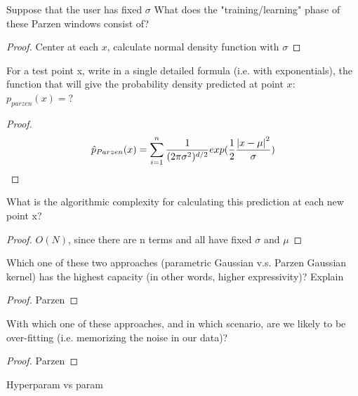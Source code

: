 \documentclass[12pt]{article}
\newenvironment{problem}[2][Problem]{\begin{trivlist}
\item[\hskip \labelsep {\bfseries #1}\hskip \labelsep {\bfseries #2.}]}{\end{trivlist}}
\begin{document}
\begin{problem}{3.2(a)}
Suppose that the user has fixed $\sigma$ What does the "training/learning" phase of these Parzen windows consist of?
\end{problem}
\begin{proof}
Center at each $x$, calculate normal density function with $\sigma$
\end{proof}

\begin{problem}{3.2(b)}
For a test point x, write in a single detailed formula (i.e. with exponentials), the function that will give the probability density predicted at point $x$: $p_{parzen}(x) = $?
\end{problem}
\begin{proof}
\begin{equation*}
\hat{p}_{Parzen}(x) = \sum_{i = 1}^{n} \frac{1}{(2\pi \sigma^2)^{d/2}} exp(\frac{1}{2} \frac{\abs{x - \mu}^2}{\sigma})
\end{equation*}
\end{proof}

\begin{problem}{3.2(c)}
 What is the algorithmic complexity for calculating this prediction at each new point x?
\end{problem}

\begin{proof}
$O(N)$, since there are n terms and all have fixed $\sigma$ and $\mu$
\end{proof}

\begin{problem}{3.3(a)}
Which one of these two approaches (parametric Gaussian v.s. Parzen Gaussian kernel) has the highest capacity (in other words, higher expressivity)? Explain
\end{problem}
\begin{proof}
Parzen
\end{proof}


\begin{problem}{3.3(b)}
With which one of these approaches, and in which scenario, are we likely to be over-fitting (i.e. memorizing the noise in our data)?
\end{problem}
\begin{proof}
Parzen
\end{proof}

\begin{problem}{3.3(c)}
Hyperparam vs param
\end{problem}
\end{document}
